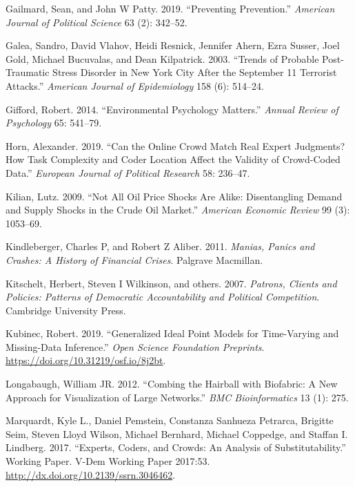 \documentclass[]{article}
\begin{document}
\leavevmode\hypertarget{ref-gailmard2019preventing}{}%
Gailmard, Sean, and John W Patty. 2019. ``Preventing Prevention.'' \emph{American Journal of Political Science} 63 (2): 342--52.

\leavevmode\hypertarget{ref-galea2003trends}{}%
Galea, Sandro, David Vlahov, Heidi Resnick, Jennifer Ahern, Ezra Susser, Joel Gold, Michael Bucuvalas, and Dean Kilpatrick. 2003. ``Trends of Probable Post-Traumatic Stress Disorder in New York City After the September 11 Terrorist Attacks.'' \emph{American Journal of Epidemiology} 158 (6): 514--24.

\leavevmode\hypertarget{ref-gifford2014environmental}{}%
Gifford, Robert. 2014. ``Environmental Psychology Matters.'' \emph{Annual Review of Psychology} 65: 541--79.

\leavevmode\hypertarget{ref-Horn2019}{}%
Horn, Alexander. 2019. ``Can the Online Crowd Match Real Expert Judgments? How Task Complexity and Coder Location Affect the Validity of Crowd-Coded Data.'' \emph{European Journal of Political Research} 58: 236--47.

\leavevmode\hypertarget{ref-kilian2009not}{}%
Kilian, Lutz. 2009. ``Not All Oil Price Shocks Are Alike: Disentangling Demand and Supply Shocks in the Crude Oil Market.'' \emph{American Economic Review} 99 (3): 1053--69.

\leavevmode\hypertarget{ref-kindleberger2011manias}{}%
Kindleberger, Charles P, and Robert Z Aliber. 2011. \emph{Manias, Panics and Crashes: A History of Financial Crises}. Palgrave Macmillan.

\leavevmode\hypertarget{ref-kitschelt2007patrons}{}%
Kitschelt, Herbert, Steven I Wilkinson, and others. 2007. \emph{Patrons, Clients and Policies: Patterns of Democratic Accountability and Political Competition}. Cambridge University Press.

\leavevmode\hypertarget{ref-kubinec2019ideal}{}%
Kubinec, Robert. 2019. ``Generalized Ideal Point Models for Time-Varying and Missing-Data Inference.'' \emph{Open Science Foundation Preprints}. \url{https://doi.org/10.31219/osf.io/8j2bt}.

\leavevmode\hypertarget{ref-longabaugh2012}{}%
Longabaugh, William JR. 2012. ``Combing the Hairball with Biofabric: A New Approach for Visualization of Large Networks.'' \emph{BMC Bioinformatics} 13 (1): 275.

\leavevmode\hypertarget{ref-marquardtetal2017}{}%
Marquardt, Kyle L., Daniel Pemstein, Constanza Sanhueza Petrarca, Brigitte Seim, Steven Lloyd Wilson, Michael Bernhard, Michael Coppedge, and Staffan I. Lindberg. 2017. ``Experts, Coders, and Crowds: An Analysis of Substitutability.'' Working Paper. V-Dem Working Paper 2017:53. \url{http://dx.doi.org/10.2139/ssrn.3046462}.
\end{document}
